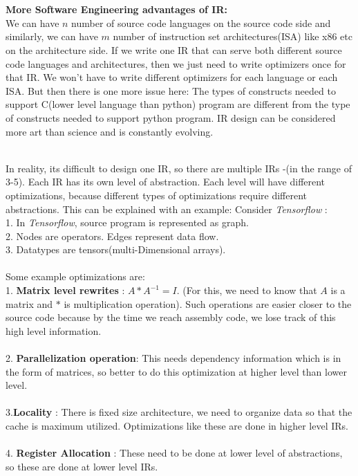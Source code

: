 \\
\\
\textbf{More Software Engineering advantages of IR:}\\
We can have $n$ number of source code languages on the source code side and  similarly, we can have $m$ number of instruction set architectures(ISA) like x86 etc on the architecture side. If we write one IR that can serve both different source code languages and architectures, then we just need to write optimizers once for that IR. We won't have to write different optimizers for each language or each ISA. 
But then there is one more issue here: The types of constructs needed to support C(lower level language than python) program are different from the type of constructs needed to support python program. IR design can be considered more art than science and is constantly evolving. 

\\In reality, its difficult to design one IR, so there are multiple IRs -(in the range of 3-5). Each IR has its own level of abstraction. Each level will have different optimizations, because different types of optimizations require different abstractions. This can be explained with an example: 
Consider \emph{Tensorflow} :\\ 
1. In \emph{Tensorflow}, source program is represented as graph.\\
2. Nodes are operators. Edges represent data flow. \\
3. Datatypes are tensors(multi-Dimensional arrays).
\\
\\
Some example optimizations are:\\
1. \textbf{Matrix level rewrites} : $A*A^{-1} = I$. (For this, we need to know that $A$ is a matrix and $*$ is multiplication operation). Such operations are easier closer to the source code because by the time we reach assembly code, we lose track of this high level information.\\ \\ 
2. \textbf{Parallelization operation}:  This needs dependency information which is in the form of matrices, so better to do this optimization at higher level than lower level. \\ \\
3.\textbf{Locality} : There is fixed size architecture, we need to organize data so that the cache is maximum utilized. Optimizations like these are done in higher level IRs. \\ \\
4. \textbf{Register Allocation} : These need to be done at lower level of abstractions, so these are done at lower level IRs. 
